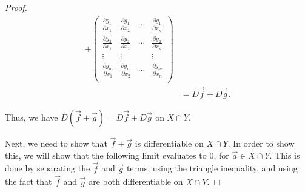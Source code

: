 \documentclass{ximera}
\begin{document}
\begin{proof}
\begin{align*}
+\left(\begin{array}{cccc}
\frac{\partial g_1}{\partial x_1} & \frac{\partial g_1}{\partial x_2} & \cdots &\frac{\partial g_1}{\partial x_n}\\
\frac{\partial g_2}{\partial x_1} & \frac{\partial g_2}{\partial x_2} & \cdots &\frac{\partial g_2}{\partial x_n}\\
 \vdots & \vdots && \vdots\\
\frac{\partial g_m}{\partial x_1} & \frac{\partial g_m}{\partial x_2} & \cdots &\frac{\partial g_m}{\partial x_n}\\
\end{array}\right)\\
&= D\vec{f}+D\vec{g}.
\end{align*}

Thus, we have $D(\vec{f}+\vec{g}) = D\vec{f}+D\vec{g}$ on $X\cap Y$.

Next, we need to show that $\vec{f}+\vec{g}$ is differentiable on $X\cap Y$. In order to show this, we will show that the following limit evaluates to $0$, for $\vec{a}\in X\cap Y$. This is done by separating the $\vec{f}$ and $\vec{g}$ terms, using the triangle inequality, and using the fact that $\vec{f}$ and $\vec{g}$ are both differentiable on $X\cap Y$.


\end{proof}
\end{document}
